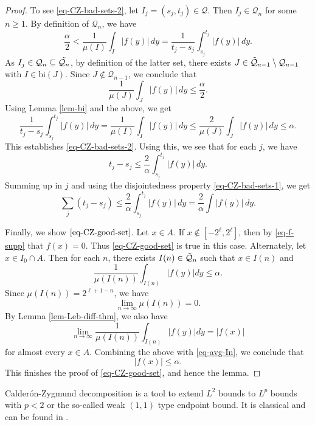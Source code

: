 {\begin{proof}
To see \eqref{eq-CZ-bad-sets-2}, let $I_j=(s_j, t_j)\in \mathcal{Q}$. Then $I_j\in \mathcal{Q}_n$ for some $n\geq 1$. By definition of $\mathcal{Q}_n$, we have
$$\frac{\alpha}{2}<\frac{1}{\mu(I)}\int_{I} |f(y)|\, dy=\frac{1}{t_j-s_j}\int_{s_j}^{t_j} |f(y)|\, dy.$$
As $I_j\in \mathcal{Q}_n\subseteq \Tilde{\mathcal{Q}_{n}}$, by definition of the latter set, there exists $J\in \Tilde{\mathcal{Q}}_{n-1}\setminus \mathcal{Q}_{n-1}$ with $I\in \textrm{bi} (J)$. Since $J\not\in \mathcal{Q}_{n-1}$, we conclude that
$$\frac{1}{\mu(J)}\int_J |f(y)|\, dy\leq \frac{\alpha}{2}.$$
Using Lemma \ref{lem-bi} and the above, we get
$$\frac{1}{t_j-s_j}\int_{s_j}^{t_j} |f(y)|\, dy=\frac{1}{\mu(I)}\int_I |f(y)|\, dy\leq \frac{2}{\mu(J)} \int_J |f(y)|\, dy\leq \alpha.$$
This establishes \eqref{eq-CZ-bad-sets-2}. Using this, we see that for each $j$, we have
$$t_j-s_j\leq \frac{2}{\alpha}\int_{s_j}^{t_j} |f(y)|\, dy.$$
Summing up in $j$ and using the disjointedness property \eqref{eq-CZ-bad-sets-1}, we get
$$\sum_{j} (t_j-s_j)\leq \frac{2}{\alpha}\int_{s_j}^{t_j} |f(y)|\, dy= \frac{2}{\alpha}\int  |f(y)|\, dy.$$

Finally, we show $\eqref{eq-CZ-good-set}$. Let $x\in A$. If $x\not \in [-2^{\ell}, 2^{\ell}]$, then by \eqref{eq-f-supp} that $f(x)=0$. Thus \eqref{eq-CZ-good-set} is true in this case. Alternately, let $x\in I_0\cap A$. Then for each $n$, there exists $I(n)\in \Tilde{\mathcal{Q}}_n$ such that $x\in I(n)$ and
\begin{equation}
    \label{eq-avg-In}
    \frac{1}{\mu(I(n))}\int_{I(n)} |f(y)| dy\leq {\alpha}.
\end{equation}
Since $\mu(I(n))=2^{\ell+1-n}$, we have
$$\lim_{n\to \infty} \mu(I(n))=0.$$
By Lemma \ref{lem-Leb-diff-thm}, we also have
\begin{equation*}
 \lim_{n\to \infty}\frac{1}{\mu(I(n))}\int_{I(n)} |f(y)| dy= |f(x)|
\end{equation*}
for almost every $x\in A$.
Combining the above with \eqref{eq-avg-In}, we conclude that
$$|f(x)|\leq \alpha.$$
This finishes the proof of \eqref{eq-CZ-good-set}, and hence the lemma.
\end{proof}

Calder\'on-Zygmund decomposition is a tool to extend $L^2$ bounds to $L^p$ bounds with $p<2$ or the so-called weak $(1, 1)$ type endpoint bound.
It is classical and can be found in \cite{stein-book}.

}
